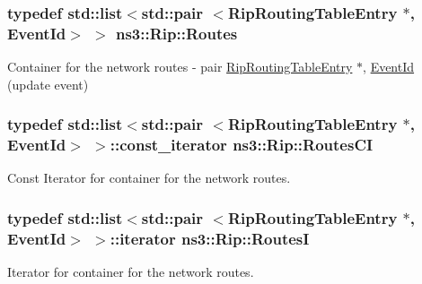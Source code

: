 \subsubsection[{\texorpdfstring{Routes}{Routes}}]{\setlength{\rightskip}{0pt plus 5cm}typedef {\bf std\+::list}$<$std\+::pair $<${\bf Rip\+Routing\+Table\+Entry} $\ast$, {\bf Event\+Id}$>$ $>$ {\bf ns3\+::\+Rip\+::\+Routes}\hspace{0.3cm}{\ttfamily [private]}}\hypertarget{classns3_1_1Rip_a7108837a80349ce23ac60d043ac81d58}{}\label{classns3_1_1Rip_a7108837a80349ce23ac60d043ac81d58}


Container for the network routes -\/ pair \hyperlink{classns3_1_1RipRoutingTableEntry}{Rip\+Routing\+Table\+Entry} $\ast$, \hyperlink{classns3_1_1EventId}{Event\+Id} (update event) 

\subsubsection[{\texorpdfstring{Routes\+CI}{RoutesCI}}]{\setlength{\rightskip}{0pt plus 5cm}typedef {\bf std\+::list}$<$std\+::pair $<${\bf Rip\+Routing\+Table\+Entry} $\ast$, {\bf Event\+Id}$>$ $>$\+::const\+\_\+iterator {\bf ns3\+::\+Rip\+::\+Routes\+CI}\hspace{0.3cm}{\ttfamily [private]}}\hypertarget{classns3_1_1Rip_a20080eb47fbc0ac67e3eba1c61cbafcb}{}\label{classns3_1_1Rip_a20080eb47fbc0ac67e3eba1c61cbafcb}


Const Iterator for container for the network routes. 

\subsubsection[{\texorpdfstring{RoutesI}{RoutesI}}]{\setlength{\rightskip}{0pt plus 5cm}typedef {\bf std\+::list}$<$std\+::pair $<${\bf Rip\+Routing\+Table\+Entry} $\ast$, {\bf Event\+Id}$>$ $>$\+::iterator {\bf ns3\+::\+Rip\+::\+RoutesI}\hspace{0.3cm}{\ttfamily [private]}}\hypertarget{classns3_1_1Rip_a8819af4dd44f270b6b19be755b39bce8}{}\label{classns3_1_1Rip_a8819af4dd44f270b6b19be755b39bce8}


Iterator for container for the network routes. 

